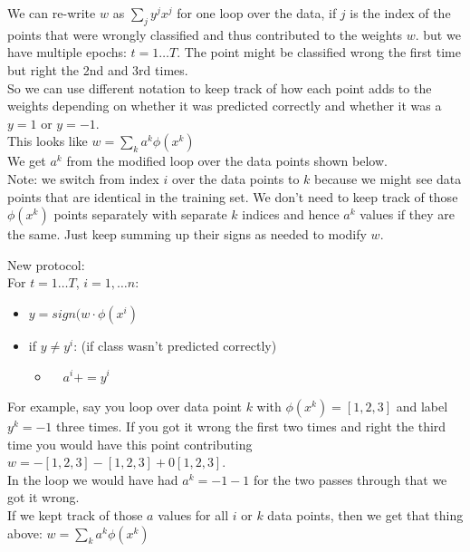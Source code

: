 We can re-write $w$ as $ \displaystyle \sum_j y^j x^j$ for one loop over the data, if $j$ is the index of the points that were wrongly classified and thus contributed to the weights $w$.  
but we have multiple epochs: $t = 1 \dots T$.  
The point might be classified wrong the first time but right the 2nd and 3rd times.  \hfill \\
So we can use different notation to keep track of how each point adds to the weights
	depending on whether it was predicted correctly and whether it was a $y=1$ or $y = -1$.  \hfill \\
	
This looks like $ \displaystyle w = \sum_k a^k \phi(x^k)$   \hfill \\
We get $a^k$ from the modified loop over the data points shown below. \hfill \\
Note: we switch from index $i$ over the data points to $k$ because we might see data points that are identical in the training set.  
We don't need to keep track of those $\phi(x^k)$ points separately with separate $k$ indices and hence $a^k$ values if they are the same.  
Just keep summing up their signs as needed to modify $w$. 

New protocol: \hfill \\
For $t = 1 \dots T$, $i = 1, \dots n$:
\begin{itemize}
	\item $ y = sign(w \cdot \phi(x^i)$
	\item if $y \neq y^i$:  (if class wasn't predicted correctly)
	\begin{itemize}
		\item $ \quad a^i += y^i$
	\end{itemize}
\end{itemize}

For example, say you loop over data point $k$ with $\phi(x^k) = [1, 2, 3]$ and label $y^k = -1$ three times.
If you got it wrong the first two times and right the third time you would have this point contributing 
$w = -[1, 2, 3] -[1, 2, 3] + 0[1, 2, 3]$. \hfill \\
In the loop we would have had $a^k = -1 -1$ for the two passes through that we got it wrong.  \hfill \\

If we kept track of those $a$ values for all $i$ or $k$ data points, then we get that thing above: 
$ \displaystyle w = \sum_k a^k \phi(x^k)$ 

